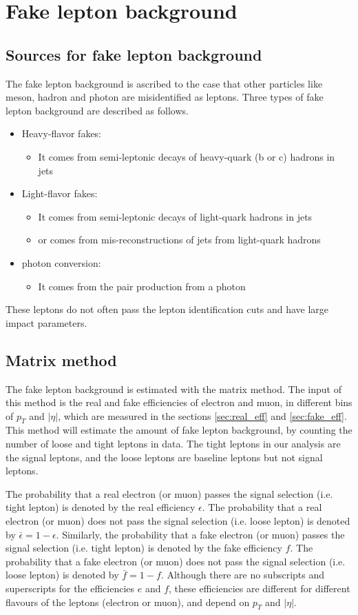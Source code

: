 \section{Fake lepton background}
\label{sec:fake_background}
\subsection{Sources for fake lepton background}
The fake lepton background is ascribed to the case that other particles like meson, hadron and photon are misidentified as leptons.
Three types of fake lepton background are described as follows.
\begin{itemize}
\item Heavy-flavor fakes:
\begin{itemize}
\item It comes from semi-leptonic decays of heavy-quark (b or c) hadrons in jets
\end{itemize}
\item Light-flavor fakes:
\begin{itemize}
\item It comes from semi-leptonic decays of light-quark hadrons in jets
\item or comes from mis-reconstructions of jets from light-quark hadrons
\end{itemize}
\item photon conversion:
\begin{itemize}
\item It comes from the pair production from a photon
\end{itemize}
\end{itemize}
These leptons do not often pass the lepton identification cuts and have large impact parameters.

\subsection{Matrix method}
The fake lepton background is estimated with the matrix method.
The input of this method is the real and fake efficiencies of electron and muon, in different bins of $p_T$ and $|\eta|$, which are measured in the sections \ref{sec:real_eff} and \ref{sec:fake_eff}.
This method will estimate the amount of fake lepton background, by counting the number of loose and tight leptons in data.
The tight leptons in our analysis are the signal leptons, and the loose leptons are baseline leptons but not signal leptons.

The probability that a real electron (or muon) passes the signal selection (i.e. tight lepton) is denoted by the real efficiency $\epsilon$.
The probability that a real electron (or muon) does not pass the signal selection (i.e. loose lepton) is denoted by $\bar{\epsilon} = 1 - \epsilon$.
Similarly, the probability that a fake electron (or muon) passes the signal selection (i.e. tight lepton) is denoted by the fake efficiency $f$.
The probability that a fake electron (or muon) does not pass the signal selection (i.e. loose lepton) is denoted by $\bar{f} = 1 - f$.
Although there are no subscripts and superscripts for the efficiencies $e$ and $f$, these efficiencies are different for different flavours of the leptons (electron or muon), and depend on $p_T$ and $|\eta|$.

